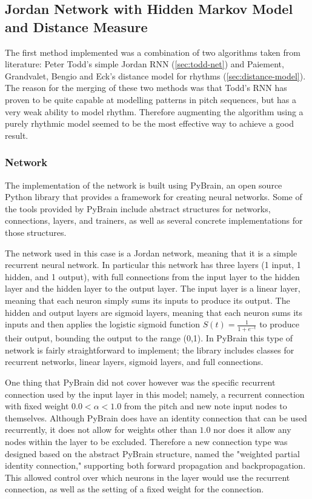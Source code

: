 \documentclass[ author={Stephen Livermore-Tozer},
				supervisor={Dr. Peter Flach},
				degree={MEng},
				title={Algorithmic Co-composition Using Machine Learning},
				subtitle={},
				type={research},
				year={2016} ]{dissertation}
\begin{document}
	\subsection{Jordan Network with Hidden Markov Model and Distance Measure}
	\label{sec:jordan-implementation}
	
	The first method implemented was a combination of two algorithms taken from literature: Peter Todd's simple Jordan RNN (\ref{sec:todd-net}) and Paiement, Grandvalet, Bengio and Eck's distance model for rhythms (\ref{sec:distance-model}). The reason for the merging of these two methods was that Todd's RNN has proven to be quite capable at modelling patterns in pitch sequences, but has a very weak ability to model rhythm. Therefore augmenting the algorithm using a purely rhythmic model seemed to be the most effective way to achieve a good result.
	
	\subsubsection{Network}
	
	The implementation of the network is built using PyBrain, an open source Python library that provides a framework for creating neural networks. Some of the tools provided by PyBrain include abstract structures for networks, connections, layers, and trainers, as well as several concrete implementations for those structures.
	
	The network used in this case is a Jordan network, meaning that it is a simple recurrent neural network. In particular this network has three layers (1 input, 1 hidden, and 1 output), with full connections from the input layer to the hidden layer and the hidden layer to the output layer. The input layer is a linear layer, meaning that each neuron simply sums its inputs to produce its output. The hidden and output layers are sigmoid layers, meaning that each neuron sums its inputs and then applies the logistic sigmoid function $ S(t) = \frac{1}{1 + e^{-t}} $ to produce their output, bounding the output to the range (0,1).
	In PyBrain this type of network is fairly straightforward to implement; the library includes classes for recurrent networks, linear layers, sigmoid layers, and full connections.
	
	One thing that PyBrain did not cover however was the specific recurrent connection used by the input layer in this model; namely, a recurrent connection with fixed weight $0.0 < \alpha < 1.0$ from the pitch and new note input nodes to themselves. Although PyBrain does have an identity connection that can be used recurrently, it does not allow for weights other than $1.0$ nor does it allow any nodes within the layer to be excluded. Therefore a new connection type was designed based on the abstract PyBrain structure, named the "weighted partial identity connection," supporting both forward propagation and backpropagation. This allowed control over which neurons in the layer would use the recurrent connection, as well as the setting of a fixed weight for the connection.
	
\end{document}
